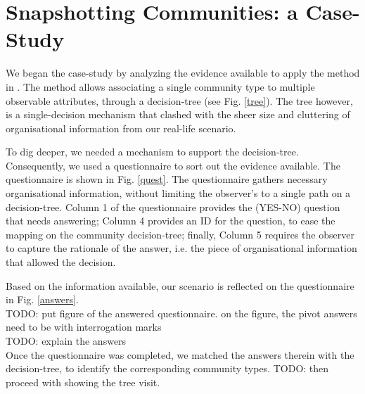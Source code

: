 \documentclass[conference]{IEEEtran}
\begin{document}
\section{Snapshotting Communities: a Case-Study}\label{cs}

We began the case-study by analyzing the evidence available to apply the method in \cite{specissue}. The method allows associating a single community type to multiple observable attributes, through a decision-tree (see Fig. \ref{tree}). The tree however, is a single-decision mechanism that clashed with the sheer size and cluttering of organisational information from our real-life scenario. 

To dig deeper, we needed a mechanism to support the decision-tree. Consequently, we used a questionnaire to sort out the evidence available. The questionnaire is shown in Fig. \ref{quest}. The questionnaire gathers necessary organisational information, without limiting the observer's to a single path on a decision-tree. Column 1 of the questionnaire provides the (YES-NO) question that needs answering; Column 4 provides an ID for the question, to ease the mapping on the community decision-tree; finally, Column 5 requires the observer to capture the rationale of the answer, i.e. the piece of organisational information that allowed the decision.

Based on the information available, our scenario is reflected on the questionnaire in Fig. \ref{answers}.\\
TODO: put figure of the answered questionnaire. on the figure, the pivot answers need to be with interrogation marks\\
TODO: explain the answers\\

Once the questionnaire was completed, we matched the answers therein with the decision-tree, to identify the corresponding community types.
TODO: then proceed with showing the tree visit.\\
\end{document}
